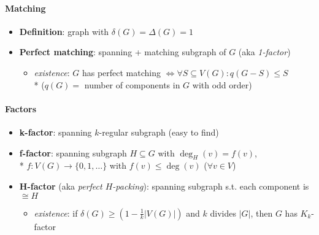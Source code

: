 \paragraph{Matching}
\begin{itemize}
  \item \textbf{Definition}: graph with $ \delta(G) = \Delta(G) = 1 $ 
  \item \textbf{Perfect matching}: spanning + matching subgraph of $ G $ (aka \emph{1-factor})
  \begin{itemize}
    \item \emph{existence}: $ G $ has perfect matching $ \Leftrightarrow \forall S \subseteq V(G) : q(G-S) \leq S $ \\*
      ($ q(G) = $ number of components in $ G $ with odd order) 
  \end{itemize}
\end{itemize}

\paragraph{Factors}
\begin{itemize}
  \item \textbf{k-factor}: spanning $ k $-regular subgraph (easy to find) 
  \item \textbf{f-factor}: spanning subgraph $ H \subseteq G $ with $ \deg_H(v) = f(v) $, \\*
    $ f: V(G) \to \{ 0,1,\dots \} $ with $ f(v) \leq \deg(v) $ \quad ($ \forall v \in V $)
  \item \textbf{H-factor} (aka \emph{perfect $ H $-packing}): spanning subgraph s.t. each component is $ \cong H $
  \begin{itemize}
    \item \emph{existence}: if $ \delta(G) \geq \left( 1 - \tfrac{1}{k}\vert V(G) \vert \right) $ and $ k $ divides $ \vert G \vert $, then $ G $ has $ K_k $-factor
  \end{itemize}
\end{itemize}


